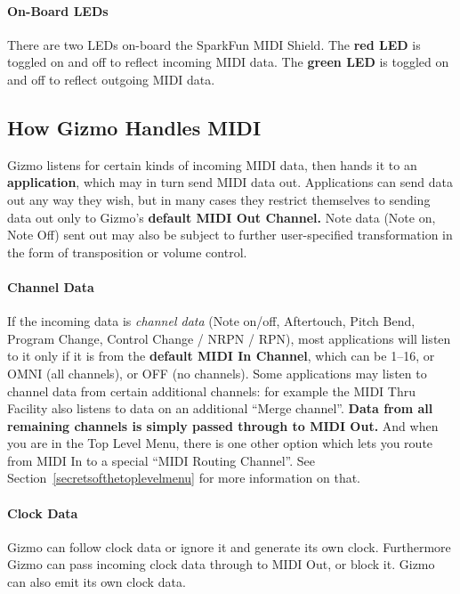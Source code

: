 \documentclass{article}
\begin{document}
\paragraph{On-Board LEDs}

There are two LEDs on-board the SparkFun MIDI Shield.  The {\bf red LED} is toggled on and off to reflect incoming MIDI data.  The {\bf green LED} is toggled on and off to reflect outgoing MIDI data.  

\subsection{How Gizmo Handles MIDI}

Gizmo listens for certain kinds of incoming MIDI data, then hands it to an {\bf application}, which may in turn send MIDI data out.  Applications can send data out any way they wish, but in many cases they restrict themselves to sending data out only to Gizmo's {\bf default MIDI Out Channel.}  Note data (Note on, Note Off) sent out may also be subject to further user-specified transformation in the form of transposition or volume control.  

\vspace{-0.5em}\paragraph{Channel Data} If the incoming data is {\it channel data} (Note on/off, Aftertouch, Pitch Bend, Program Change, Control Change / NRPN / RPN), most applications will listen to it only if it is from the {\bf default MIDI In Channel}, which can be 1--16, or OMNI (all channels), or OFF (no channels).  Some applications may listen to channel data from certain additional channels: for example the MIDI Thru Facility also listens to data on an additional ``Merge channel''.  {\bf Data from all remaining channels is simply passed through to MIDI Out. }   And when you are in the Top Level Menu, there is one other option which lets you route from MIDI In to a special ``MIDI Routing Channel''.  See Section~\ref{secretsofthetoplevelmenu} for more information on that.

\vspace{-0.5em}\paragraph{Clock Data} Gizmo can follow clock data or ignore it and generate its own clock.  Furthermore Gizmo can pass incoming clock data through to MIDI Out, or block it.  Gizmo can also emit its own clock data.
\end{document}
